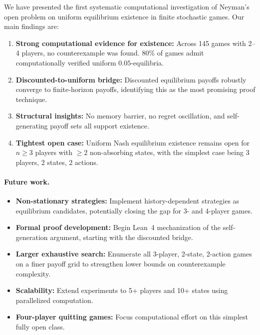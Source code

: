 \documentclass[11pt,a4paper]{article}
\theoremstyle{definition}
\begin{document}
We have presented the first systematic computational investigation of Neyman's open problem on uniform equilibrium existence in finite stochastic games.
Our main findings are:

\begin{enumerate}[leftmargin=1.5em]
    \item \textbf{Strong computational evidence for existence:} Across 145 games with 2--4 players, no counterexample was found. 80\% of games admit computationally verified uniform $0.05$-equilibria.
    \item \textbf{Discounted-to-uniform bridge:} Discounted equilibrium payoffs robustly converge to finite-horizon payoffs, identifying this as the most promising proof technique.
    \item \textbf{Structural insights:} No memory barrier, no regret oscillation, and self-generating payoff sets all support existence.
    \item \textbf{Tightest open case:} Uniform Nash equilibrium existence remains open for $n \geq 3$ players with $\geq 2$ non-absorbing states, with the simplest case being 3 players, 2 states, 2 actions.
\end{enumerate}

\paragraph{Future work.}
\begin{itemize}[leftmargin=1.5em]
    \item \textbf{Non-stationary strategies:} Implement history-dependent strategies as equilibrium candidates, potentially closing the gap for 3- and 4-player games.
    \item \textbf{Formal proof development:} Begin Lean~4 mechanization of the self-generation argument, starting with the discounted bridge.
    \item \textbf{Larger exhaustive search:} Enumerate all 3-player, 2-state, 2-action games on a finer payoff grid to strengthen lower bounds on counterexample complexity.
    \item \textbf{Scalability:} Extend experiments to 5+ players and 10+ states using parallelized computation.
    \item \textbf{Four-player quitting games:} Focus computational effort on this simplest fully open class.
\end{itemize}



\end{document}
